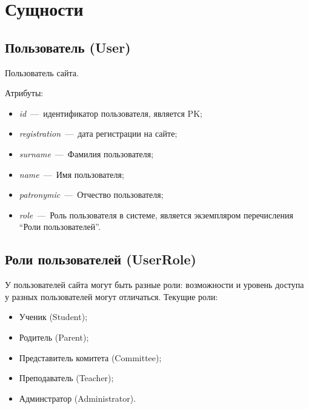 \documentclass[14pt]{article}
\begin{document}
\begin{center}
\end{center}
\section{Сущности}

\subsection{Пользователь (User)}

Пользователь сайта. 

Атрибуты:

\begin{itemize}
	\item \emph{id}~---~идентификатор пользователя, является PK;
	\item \emph{registration}~---~дата регистрации на сайте;
	\item \emph{surname}~---~Фамилия пользователя;
	\item \emph{name}~---~Имя пользователя;
	\item \emph{patronymic}~---~Отчество пользователя;
	\item \emph{role}~---~Роль пользователя в системе, является экземпляром перечисления ``Роли пользователей''.
\end{itemize}

\subsection{Роли пользователей (UserRole)}

У пользователей сайта могут быть разные роли: возможности и уровень доступа у разных пользователей могут отличаться.
Текущие роли:
\begin{itemize}
	\item Ученик (Student);
	\item Родитель (Parent);
	\item Представитель комитета (Committee);
	\item Преподаватель (Teacher);
	\item Админстратор (Administrator).
\end{itemize}
\end{document}
